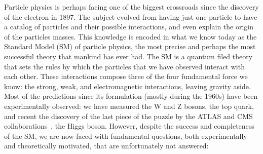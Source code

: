 Particle physics is perhaps facing one of the biggest crossroads since
the discovery of the electron in 1897. The subject evolved from having
just one particle to have a catalog of particles and their possible
interactions, and even explain the origin of the particles
masses. This knowledge is encoded in what we know today as the
Standard Model (SM) of particle physics, the most precise and perhaps
the most successful theory that mankind has ever had. The SM is a
quantum filed theory that sets the
rules by which the particles that we have observed interact with each
other. These interactions compose three of the four fundamental force
we know: the strong, weak, and electromagnetic interactions, leaving
gravity aside. Most of the predictions since its formulation (mostly
during the 1960s) have been experimentally observed: we have measured the W and Z
bosons, the top quark, and recent the discovery of the last piece of
the puzzle by the ATLAS and CMS
collaborations~\cite{CMSHIGGS,ATLASHIGGS}, the Higgs boson. However, despite the success and completeness of
the SM, we are now faced with fundamental questions, both experimentally and theoretically motivated, 
that are unfortunately not answered:

